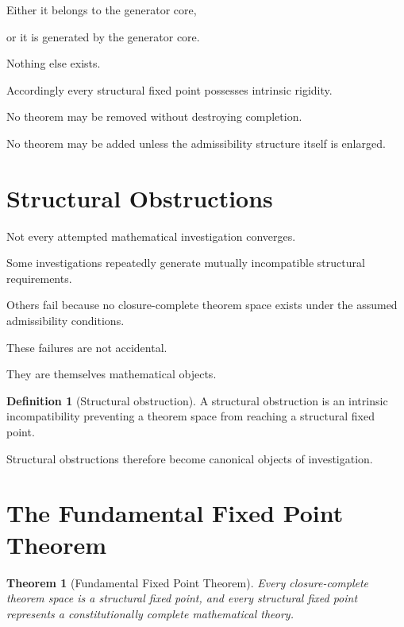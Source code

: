 \documentclass[13pt,openany]{book}
\theoremstyle{plain}
\newtheorem{theorem}{Theorem}[chapter]
\theoremstyle{definition}
\newtheorem{definition}{Definition}[chapter]
\begin{document}
Either it belongs to the generator core,

or it is generated by the generator core.

Nothing else exists.

Accordingly every structural fixed point possesses intrinsic rigidity.

No theorem may be removed without destroying completion.

No theorem may be added unless the admissibility structure itself is enlarged.

\section{Structural Obstructions}

Not every attempted mathematical investigation converges.

Some investigations repeatedly generate mutually incompatible structural
requirements.

Others fail because no closure-complete theorem space exists under the assumed
admissibility conditions.

These failures are not accidental.

They are themselves mathematical objects.

\begin{definition}[Structural obstruction]

A structural obstruction is an intrinsic incompatibility preventing a theorem
space from reaching a structural fixed point.

\end{definition}

Structural obstructions therefore become canonical objects of investigation.

\section{The Fundamental Fixed Point Theorem}

\begin{theorem}[Fundamental Fixed Point Theorem]

Every closure-complete theorem space is a structural fixed point, and every
structural fixed point represents a constitutionally complete mathematical
theory.

\end{theorem}
\end{document}
